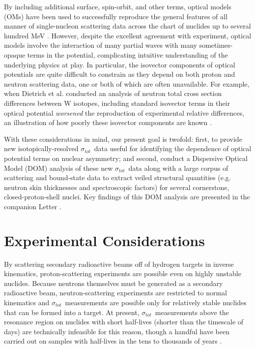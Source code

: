 \documentclass[twocolumn,secnumarabic,amssymb, nobibnotes, aps, prl,
superscriptaddress, nobalancelastpage, draft]{revtex4}
\newcommand{\tot}{\ensuremath{\sigma_{tot}}}
\begin{document}
By including additional surface, spin-orbit, and other terms, optical models (OMs) have been 
used to successfully reproduce the general features of all manner of single-nucleon scattering 
data across the chart of nuclides up to several hundred MeV \cite{Perey1976,
CH89, KoningDelaroche}. However, despite the excellent agreement with experiment, optical models
involve the interaction of many partial waves with many sometimes-opaque terms
in the potential, complicating intuitive understanding of the underlying
physics at play. In particular, the isovector components of optical potentials
are quite difficult to constrain as they depend on both proton and neutron 
scattering data, one or both of which are often unavailable. For example,
when Dietrich et al. conducted an analysis of neutron total cross section
differences between W isotopes, including standard isovector terms in their
optical potential \textit{worsened} the reproduction of experimental
relative differences, an
illustration of how poorly these isovector components are known \cite{Dietrich2003}.

With these considerations in mind, our present goal is twofold: first, to
provide new isotopically-resolved \tot\ data useful for identifying the 
dependence of optical 
potential terms on nuclear asymmetry; and second, conduct a Dispersive Optical Model
(DOM) analysis of these new \tot\ data along with a large corpus of scattering
and bound-state data to extract veiled structural quantities (e.g. neutron skin
thicknesses and spectroscopic factors) for several cornerstone, closed-proton-shell nuclei.
Key findings of this DOM analysis are presented in the companion Letter \cite{Pruitt2020PRL}.

\section{Experimental Considerations}
By scattering secondary radioactive beams off of hydrogen targets in inverse
kinematics, proton-scattering experiments are possible even on highly unstable
nuclides. Because neutrons themselves must be generated as a
secondary radioactive beam, neutron-scattering experiments are restricted to
normal kinematics and \tot\ measurements are possible only for relatively stable
nuclides that can be formed into a target. At present, \tot\ measurements above
the resonance region on nuclides with short half-lives (shorter than the timescale of
days) are technically infeasible for this reason, though a handful have been carried out on
samples with half-lives in the tens to thousands of years \cite{Poenitz1983,
Phillips1980, Foster1971}.
\end{document}
